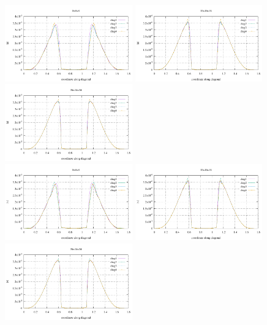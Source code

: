 \begin{center}
\includegraphics[width=5.5cm]{python_codes/fieldstone_82/results/bench4/u_08}
\includegraphics[width=5.5cm]{python_codes/fieldstone_82/results/bench4/u_16}
\includegraphics[width=5.5cm]{python_codes/fieldstone_82/results/bench4/u_24}\\
\includegraphics[width=5.5cm]{python_codes/fieldstone_82/results/bench4/v_08}
\includegraphics[width=5.5cm]{python_codes/fieldstone_82/results/bench4/v_16}
\includegraphics[width=5.5cm]{python_codes/fieldstone_82/results/bench4/v_24}\\

\end{center}
